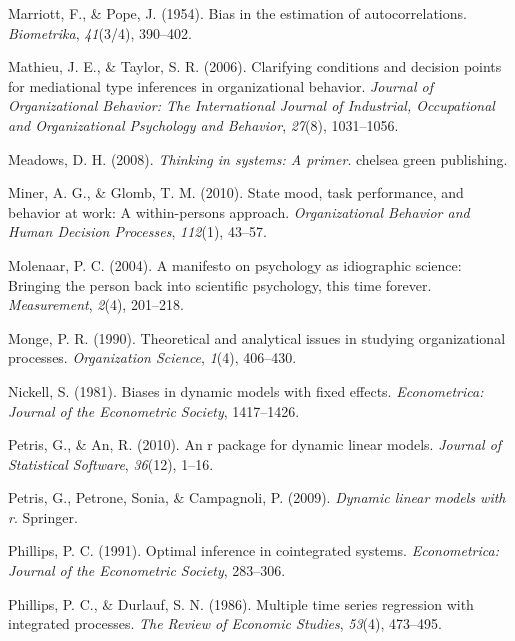\documentclass[english,,man]{apa6}
\begin{document}
\leavevmode\hypertarget{ref-marriott1954bias}{}%
Marriott, F., \& Pope, J. (1954). Bias in the estimation of autocorrelations. \emph{Biometrika}, \emph{41}(3/4), 390--402.

\leavevmode\hypertarget{ref-mathieu2006clarifying}{}%
Mathieu, J. E., \& Taylor, S. R. (2006). Clarifying conditions and decision points for mediational type inferences in organizational behavior. \emph{Journal of Organizational Behavior: The International Journal of Industrial, Occupational and Organizational Psychology and Behavior}, \emph{27}(8), 1031--1056.

\leavevmode\hypertarget{ref-meadows2008thinking}{}%
Meadows, D. H. (2008). \emph{Thinking in systems: A primer}. chelsea green publishing.

\leavevmode\hypertarget{ref-miner2010state}{}%
Miner, A. G., \& Glomb, T. M. (2010). State mood, task performance, and behavior at work: A within-persons approach. \emph{Organizational Behavior and Human Decision Processes}, \emph{112}(1), 43--57.

\leavevmode\hypertarget{ref-molenaar_manifesto_2004}{}%
Molenaar, P. C. (2004). A manifesto on psychology as idiographic science: Bringing the person back into scientific psychology, this time forever. \emph{Measurement}, \emph{2}(4), 201--218.

\leavevmode\hypertarget{ref-monge_theoretical_1990}{}%
Monge, P. R. (1990). Theoretical and analytical issues in studying organizational processes. \emph{Organization Science}, \emph{1}(4), 406--430.

\leavevmode\hypertarget{ref-nickell1981biases}{}%
Nickell, S. (1981). Biases in dynamic models with fixed effects. \emph{Econometrica: Journal of the Econometric Society}, 1417--1426.

\leavevmode\hypertarget{ref-petris2010r}{}%
Petris, G., \& An, R. (2010). An r package for dynamic linear models. \emph{Journal of Statistical Software}, \emph{36}(12), 1--16.

\leavevmode\hypertarget{ref-petris}{}%
Petris, G., Petrone, Sonia, \& Campagnoli, P. (2009). \emph{Dynamic linear models with r}. Springer.

\leavevmode\hypertarget{ref-phillips_optimal_1991}{}%
Phillips, P. C. (1991). Optimal inference in cointegrated systems. \emph{Econometrica: Journal of the Econometric Society}, 283--306.

\leavevmode\hypertarget{ref-phillips_multiple_1986}{}%
Phillips, P. C., \& Durlauf, S. N. (1986). Multiple time series regression with integrated processes. \emph{The Review of Economic Studies}, \emph{53}(4), 473--495.
\end{document}
